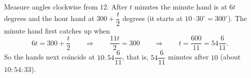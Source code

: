Measure angles clockwise from $12$. After $t$ minutes the minute hand is at $6t$ degrees and the hour hand at $300+\dfrac {t}{2}$ degrees (it starts at $10\cdot30^\circ=300^\circ$). The minute hand first catches up when
\[
6t=300+\dfrac {t}{2}\qquad\Longrightarrow\qquad \dfrac{11t}{2}=300\qquad\Longrightarrow\qquad t=\dfrac{600}{11}=54\dfrac{6}{11}.
\]
So the hands next coincide at $\boxed{10{:}54\dfrac{6}{11}}$, that is, $54\dfrac{6}{11}$ minutes after $10$ (about $10{:}54{:}33$).
